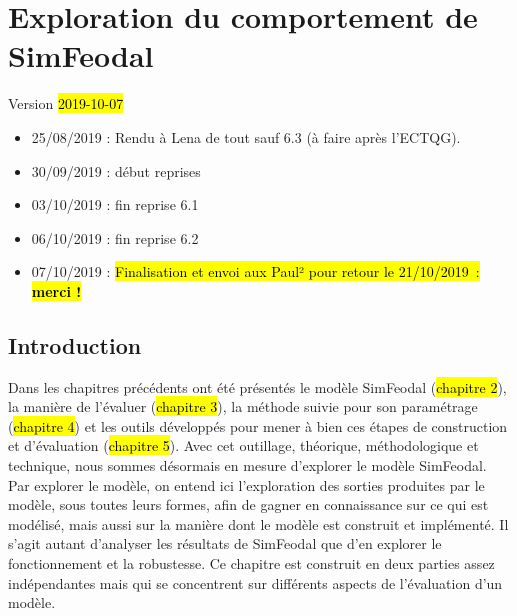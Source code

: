 \setcounter{chapter}{4}
\graphicspath{{chap5/}}


\chapter{Exploration du comportement de SimFeodal}
\label{chap:chap5}
\begin{center}
	{\large Version \hl{2019-10-07}}
\end{center}

\begin{itemize}
	\item 25/08/2019 : Rendu à Lena de tout sauf 6.3 (à faire après l'ECTQG).
	\item 30/09/2019 : début reprises
	\item 03/10/2019 : fin reprise 6.1
	\item 06/10/2019 : fin reprise 6.2
	\item 07/10/2019 : \hl{Finalisation et envoi aux Paul² pour retour le 21/10/2019~: \textbf{merci !}}
\end{itemize} 
\setcounter{minitocdepth}{2}
\minitoc
\clearpage
{}

\section*{Introduction}

Dans les chapitres précédents ont été présentés le modèle SimFeodal (\hl{chapitre 2}), la manière de l'évaluer (\hl{chapitre 3}), la méthode suivie pour son paramétrage (\hl{chapitre 4}) et les outils développés pour mener à bien ces étapes de construction et d'évaluation (\hl{chapitre 5}).
Avec cet outillage, théorique, méthodologique et technique, nous sommes désormais en mesure d'explorer le modèle SimFeodal.
Par \og explorer le modèle\fg{}, on entend ici l'exploration des sorties produites par le modèle, sous toutes leurs formes, afin de gagner en connaissance sur ce qui est modélisé, mais aussi sur la manière dont le modèle est construit et implémenté.
Il s'agit autant d'analyser les \og résultats\fg{} de SimFeodal que d'en explorer le fonctionnement et la robustesse.
Ce chapitre est construit en deux parties assez indépendantes mais qui se concentrent sur différents aspects de l'évaluation d'un modèle.

